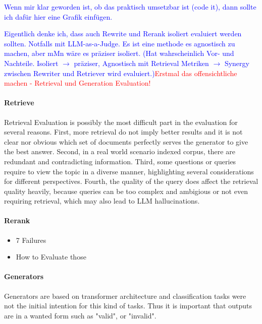 \textcolor{blue}{Wenn mir klar geworden ist, ob das praktisch umsetzbar ist (code it), dann sollte ich dafür hier eine Grafik einfügen.}

\textcolor{blue}{Eigentlich denke ich, dass auch Rewrite und Rerank isoliert evaluiert werden sollten. Notfalls mit LLM-as-a-Judge. Es ist eine methode es agnostisch zu machen, aber mMn wäre es präziser isoliert. (Hat wahrscheinlich Vor- und Nachteile. Isoliert $\longrightarrow$ präziser, Agnostisch mit Retrieval Metriken $\longrightarrow$ Synergy zwischen Rewriter und Retriever wird evaluiert.)}\textcolor{red}{Erstmal das offensichtliche machen - Retrieval und Generation Evaluation!}

\paragraph{Retrieve}
Retrieval Evaluation is possibly the most difficult part in the evaluation for several reasons. First, more retrieval do not imply better results and it is not clear nor obvious which set of documents perfectly serves the generator to give the best answer.\cite{Jin.5222024} Second, in a real world scenario indexed corpus, there are redundant and contradicting information.\cite{Yu.2024} Third, some questions or queries require to view the topic in a diverse manner, highlighting several considerations for different perspectives. Fourth, the quality of the query does affect the retrieval quality heavily, because queries can be too complex and ambigious or not even requiring retrieval, which may also lead to LLM hallucinations.\cite{Huang.2023}



\paragraph{Rerank}


\begin{itemize}
    \item 7 Failures
    \item How to Evaluate those
\end{itemize}

\paragraph{Generators}
Generators are based on transformer architecture and classification tasks were not the initial intention for this kind of tasks. Thus it is important that outputs are in a wanted form such as "valid", or "invalid".

